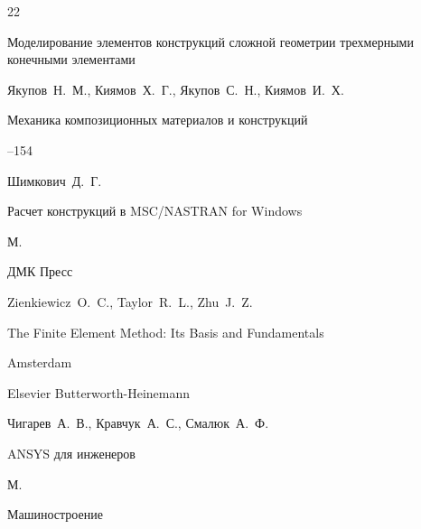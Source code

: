 \begin{thebibliography}{22}

\paper Моделирование элементов конструкций сложной геометрии трехмерными конечными элементами

\by Якупов~Н.~М., Киямов~Х.~Г., Якупов~С.~Н., Киямов~И.~Х.

\jour Механика композиционных материалов и конструкций




--154





\by Шимкович~Д.~Г.

\book Расчет конструкций в MSC/NASTRAN for Windows

\publaddr М.

\publ ДМК Пресс







\by Zienkiewicz~O.~C., Taylor~R.~L., Zhu~J.~Z.

\book The Finite Element Method: Its Basis and Fundamentals

\publaddr Amsterdam

\publ Elsevier Butterworth-Heinemann






\by Чигарев~А.~В., Кравчук~А.~С., Смалюк~А.~Ф.

\book ANSYS для инженеров

\publaddr М.

\publ Машиностроение







\end{thebibliography}
